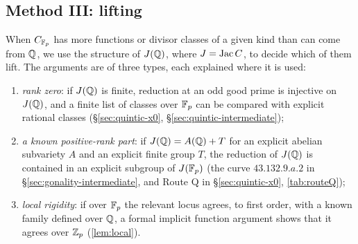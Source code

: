 \subsection{Method III: lifting}\label{sec:method-III}
When $C_{\mathbb{F}_p}$ has more functions or divisor classes of a given kind than can come from $\mathbb{Q}$, we use the
structure of $J(\mathbb{Q})$, where $J=\operatorname{Jac} C$, to decide which of them lift. The arguments are of three types, each
explained where it is used:
\begin{enumerate}
\item \emph{rank zero}: if $J(\mathbb{Q})$ is finite, reduction at an odd good prime is injective on $J(\mathbb{Q})$, and
 a finite list of classes over $\mathbb{F}_p$ can be compared with explicit rational classes
 (\S\ref{sec:quintic-x0}, \S\ref{sec:quintic-intermediate});
\item \emph{a known positive-rank part}: if $J(\mathbb{Q})=A(\mathbb{Q})+T$ for an explicit abelian subvariety $A$ and an
 explicit finite group $T$, the reduction of $J(\mathbb{Q})$ is contained in an explicit subgroup of $J(\mathbb{F}_p)$
 (the curve $43.132.9.a.2$ in \S\ref{sec:gonality-intermediate}, and Route Q in \S\ref{sec:quintic-x0}, \cref{tab:routeQ});
\item \emph{local rigidity}: if over $\mathbb{F}_p$ the relevant locus agrees, to first order, with a known family
 defined over $\mathbb{Q}$, a formal implicit function argument shows that it agrees over $\mathbb{Z}_p$
 (\cref{lem:local}).
\end{enumerate}
